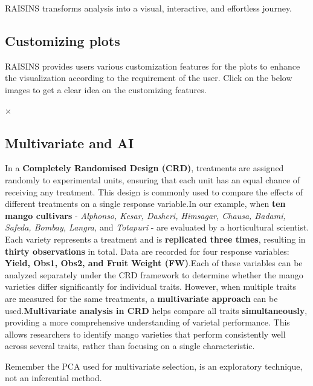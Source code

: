 \documentclass[
  letterpaper,
  DIV=11,
  numbers=noendperiod]{scrartcl}
\begin{document}
RAISINS transforms analysis into a visual, interactive, and effortless
journey.

\hypertarget{customizing-plots}{%
\subsection{Customizing plots}\label{customizing-plots}}

RAISINS provides users various customization features for the plots to
enhance the visualization according to the requirement of the user.
Click on the below images to get a clear idea on the customizing
features.

\leavevmode{}%
{×}

\hypertarget{sec-multivariateAI}{%
\subsection{Multivariate and AI}\label{sec-multivariateAI}}

In a \textbf{Completely Randomised Design (CRD)}, treatments are
assigned randomly to experimental units, ensuring that each unit has an
equal chance of receiving any treatment. This design is commonly used to
compare the effects of different treatments on a single response
variable.In our example, when \textbf{ten mango cultivars} -
\emph{Alphonso, Kesar, Dasheri, Himsagar, Chausa, Badami, Safeda,
Bombay, Langra,} and \emph{Totapuri} - are evaluated by a horticultural
scientist. Each variety represents a treatment and is \textbf{replicated
three times}, resulting in \textbf{thirty observations} in total. Data
are recorded for four response variables: \textbf{Yield, Obs1, Obs2, and
Fruit Weight (FW)}.Each of these variables can be analyzed separately
under the CRD framework to determine whether the mango varieties differ
significantly for individual traits. However, when multiple traits are
measured for the same treatments, a \textbf{multivariate approach} can
be used.\textbf{Multivariate analysis in CRD} helps compare all traits
\textbf{simultaneously}, providing a more comprehensive understanding of
varietal performance. This allows researchers to identify mango
varieties that perform consistently well across several traits, rather
than focusing on a single characteristic.

Remember the PCA used for multivariate selection, is an exploratory
technique, not an inferential method.
\end{document}
